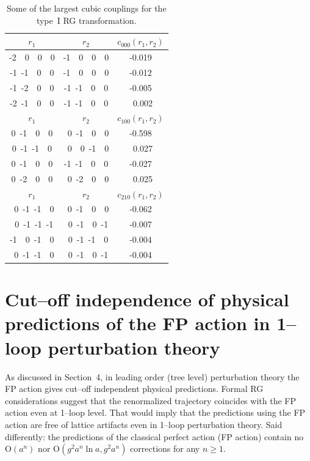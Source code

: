 \begin{table}
\begin{center}
\begin{tabular}{c c c}      \hline
  $r_1$     &    $r_2$   &    $c_{000}(r_1,r_2)$ \\   \hline
-2~~0~~0~~0   & -1~~0~~0~~0   &    -0.019        \\
-1~-1~~0~~0   & -1~~0~~0~~0   &    -0.012        \\
-1~-2~~0~~0   & -1~-1~~0~~0   &    -0.005        \\
-2~-1~~0~~0   & -1~-1~~0~~0   &    ~0.002        \\
\hline
  $r_1$     &    $r_2$   &    $c_{100}(r_1,r_2)$ \\   \hline
 0~-1~~0~~0   & ~0~-1~~0~~0   &    -0.598       \\
 0~-1~-1~~0   & ~0~~0~-1~~0   &    ~0.027       \\
 0~-1~~0~~0   & -1~-1~~0~~0   &    -0.027      \\
 0~-2~~0~~0   & ~0~-2~~0~~0   &    ~0.025      \\
\hline
  $r_1$     &    $r_2$   &    $c_{210}(r_1,r_2)$ \\   \hline
~0~-1~-1~~0   & ~0~-1~~0~~0   &    -0.062       \\
~0~-1~-1~-1   & ~0~-1~~0~-1   &    -0.007       \\
-1~~0~-1~~0   & ~0~-1~-1~~0   &    -0.004       \\
~0~-1~-1~~0   & ~0~-1~~0~-1   &    -0.004       \\
\hline
\end{tabular}
\end{center}
\caption{Some of the largest cubic couplings for the type~I RG transformation.}
\label{tab:c}
\end{table}


\section{Cut--off independence of physical predictions of the FP action
in 1--loop perturbation theory}

As discussed in Section~4, in leading order (tree level)
perturbation theory the FP action gives cut--off independent
physical predictions. Formal RG considerations suggest that 
the renormalized trajectory coincides with the FP action even at
1--loop level. That would imply that the predictions using the FP action
are free of lattice artifacts even in 1--loop perturbation
theory. Said differently: the predictions of the classical perfect
action (FP action) contain no O$\left( a^n \right)$ nor
O$\left( g^2 a^n \ln a, g^2 a^n\right)$ corrections for any $n\ge 1.$

